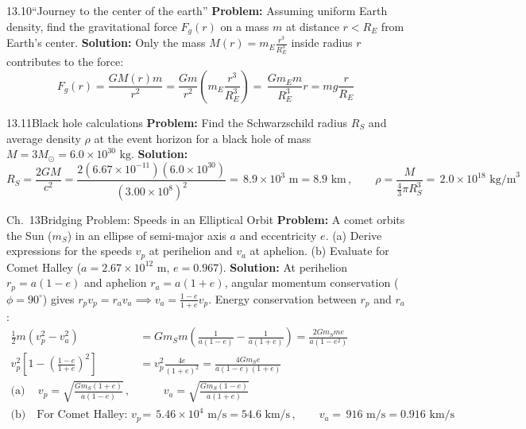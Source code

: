 \documentclass[11pt,a4paper,openany,oneside]{book}
\newcommand{\eqbox}[1]{\boxed{\,#1\,}}
\numberwithin{equation}{chapter}
\newcommand{\bk}[1]{\texorpdfstring{\enspace{\normalfont\small\color{slate}[Book #1]}}{ [Book #1]}}
\begin{document}
\begin{example}{13.10}{``Journey to the center of the earth''\bk{p.\ 420}}
\textbf{Problem:} Assuming uniform Earth density, find the gravitational force $F_g(r)$ on a mass $m$ at distance $r < R_E$ from Earth's center.
\tcblower
\textbf{Solution:} Only the mass $M(r) = m_E\frac{r^3}{R_E^3}$ inside radius $r$ contributes to the force:
\begin{equation*}
  F_g(r) = \frac{GM(r)m}{r^2} = \frac{Gm}{r^2}\!\left(m_E\frac{r^3}{R_E^3}\right) = \eqbox{\frac{Gm_E m}{R_E^3}r = mg\frac{r}{R_E}}
\end{equation*}
\end{example}

\begin{example}{13.11}{Black hole calculations\bk{p.\ 424}}
\textbf{Problem:} Find the Schwarzschild radius $R_S$ and average density $\rho$ at the event horizon for a black hole of mass $M = 3M_\odot = 6.0\times 10^{30}\text{ kg}$.
\tcblower
\textbf{Solution:}
\begin{equation*}
  R_S = \frac{2GM}{c^2} = \frac{2(6.67\times 10^{-11})(6.0\times 10^{30})}{(3.00\times 10^8)^2} = \eqbox{8.9\times 10^3\text{ m} = 8.9\text{ km}}, \qquad \rho = \frac{M}{\frac{4}{3}\pi R_S^3} = \eqbox{2.0\times 10^{18}\text{ kg/m}^3}
\end{equation*}
\end{example}

\begin{example}{Ch.\ 13}{Bridging Problem: Speeds in an Elliptical Orbit\bk{p.\ 428}}
\textbf{Problem:} A comet orbits the Sun ($m_S$) in an ellipse of semi-major axis $a$ and eccentricity $e$. (a) Derive expressions for the speeds $v_p$ at perihelion and $v_a$ at aphelion. (b) Evaluate for Comet Halley ($a = 2.67\times 10^{12}\text{ m}$, $e = 0.967$).
\tcblower
\textbf{Solution:} At perihelion $r_p = a(1-e)$ and aphelion $r_a = a(1+e)$, angular momentum conservation ($\phi = 90^\circ$) gives $r_p v_p = r_a v_a \implies v_a = \frac{1-e}{1+e}v_p$. Energy conservation between $r_p$ and $r_a$:
\begin{align*}
  \frac{1}{2}m(v_p^2 - v_a^2) &= Gm_S m\!\left(\frac{1}{a(1-e)} - \frac{1}{a(1+e)}\right) = \frac{2Gm_S m e}{a(1-e^2)}\\
  v_p^2\!\left[1 - \left(\frac{1-e}{1+e}\right)^2\right] &= v_p^2\frac{4e}{(1+e)^2} = \frac{4Gm_S e}{a(1-e)(1+e)}\\
  \text{(a)}\quad \eqbox{v_p = \sqrt{\frac{Gm_S(1+e)}{a(1-e)}}}, &\qquad \eqbox{v_a = \sqrt{\frac{Gm_S(1-e)}{a(1+e)}}}\\
  \text{(b)}\quad \text{For Comet Halley: } v_p &= \eqbox{5.46\times 10^4\text{ m/s} = 54.6\text{ km/s}}, \qquad v_a = \eqbox{916\text{ m/s} = 0.916\text{ km/s}}
\end{align*}
\end{example}
\end{document}
